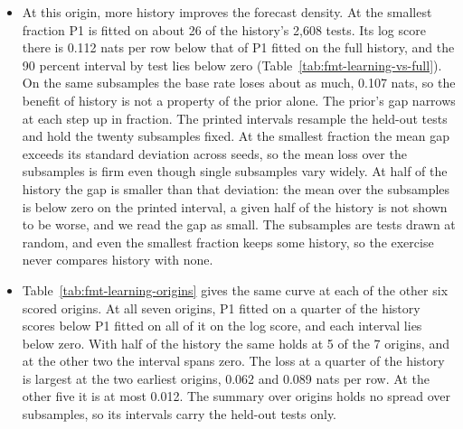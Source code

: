\begin{itemize}
\item At this origin, more history improves the forecast density. At the smallest fraction P1 is fitted on about 26 of the history's 2,608 tests. Its log score there is 0.112 nats per row below that of P1 fitted on the full history, and the 90 percent interval by test lies below zero (Table~\ref{tab:fmt-learning-vs-full}). On the same subsamples the base rate loses about as much, 0.107 nats, so the benefit of history is not a property of the prior alone. The prior's gap narrows at each step up in fraction. The printed intervals resample the held-out tests and hold the twenty subsamples fixed. At the smallest fraction the mean gap exceeds its standard deviation across seeds, so the mean loss over the subsamples is firm even though single subsamples vary widely. At half of the history the gap is smaller than that deviation: the mean over the subsamples is below zero on the printed interval, a given half of the history is not shown to be worse, and we read the gap as small. The subsamples are tests drawn at random, and even the smallest fraction keeps some history, so the exercise never compares history with none.
\item Table~\ref{tab:fmt-learning-origins} gives the same curve at each of the other six scored origins. At all seven origins, P1 fitted on a quarter of the history scores below P1 fitted on all of it on the log score, and each interval lies below zero. With half of the history the same holds at 5 of the 7 origins, and at the other two the interval spans zero. The loss at a quarter of the history is largest at the two earliest origins, 0.062 and 0.089 nats per row. At the other five it is at most 0.012. The summary over origins holds no spread over subsamples, so its intervals carry the held-out tests only.

\end{itemize}

